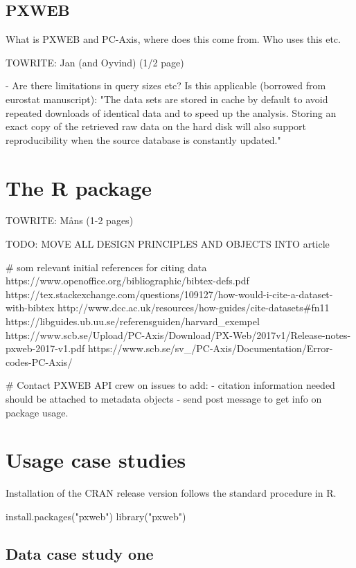 \documentclass[article]{jss}
\begin{document}
\subsection[PXWEB and PC-Axis]{PXWEB}

What is PXWEB and PC-Axis, where does this come from. Who uses this etc.

TOWRITE: Jan (and Oyvind) (1/2 page)

- Are there limitations in query sizes etc? Is this applicable (borrowed from eurostat manuscript): "The data sets are stored in cache by default to avoid repeated downloads of identical data and to speed up the analysis. Storing an exact copy of the retrieved raw data on the hard disk will also support reproducibility when the source database is constantly updated."


\section[pxweb]{The  R package}

TOWRITE: Måns (1-2 pages)

TODO: MOVE ALL DESIGN PRINCIPLES AND OBJECTS INTO article

# som relevant initial references for citing data
https://www.openoffice.org/bibliographic/bibtex-defs.pdf
https://tex.stackexchange.com/questions/109127/how-would-i-cite-a-dataset-with-bibtex
http://www.dcc.ac.uk/resources/how-guides/cite-datasets#fn11
https://libguides.ub.uu.se/referensguiden/harvard\_exempel
https://www.scb.se/Upload/PC-Axis/Download/PX-Web/2017v1/Release-notes-pxweb-2017-v1.pdf
https://www.scb.se/sv\_/PC-Axis/Documentation/Error-codes-PC-Axis/

# Contact PXWEB API crew on issues to add:
- citation information needed should be attached to metadata objects
- send post message to get info on package usage.


\section[case studies]{Usage case studies}

Installation of the CRAN release version follows the standard procedure in R.

\begin{example}
  install.packages("pxweb")
  library("pxweb")
\end{example}



\subsection{Data case study one}
\end{document}
